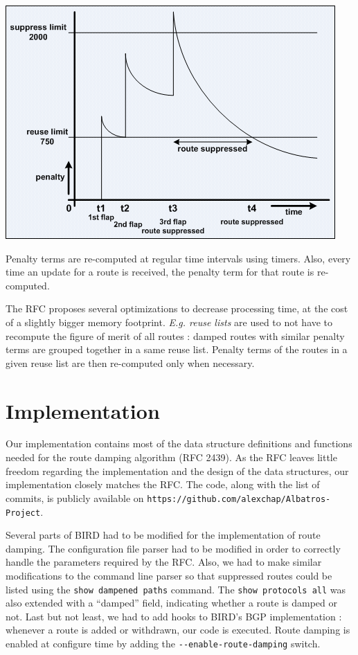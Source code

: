 \documentclass[a4paper,english]{IEEEtran}
\begin{document}
\begin{center}
\includegraphics[scale=0.5]{route_damping} 
\par\end{center}

Penalty terms are re-computed at regular time intervals using timers.
Also, every time an update for a route is received, the penalty term
for that route is re-computed.

The RFC proposes several optimizations to decrease processing time,
at the cost of a slightly bigger memory footprint. \textit{E.g. reuse
lists} are used to not have to recompute the figure of merit of all
routes : damped routes with similar penalty terms are grouped together
in a same reuse list. Penalty terms of the routes in a given reuse
list are then re-computed only when necessary.


\section{Implementation}

Our implementation contains most of the data structure definitions
and functions needed for the route damping algorithm (RFC 2439).
As the RFC leaves little freedom regarding the implementation and the 
design of the data structures, our implementation closely matches the RFC.
The code, along with the list of commits, is publicly available on
{\tt\small https://github.com/alexchap/Albatros-Project}.

Several parts of BIRD had to be modified for the implementation of route damping.
The configuration file parser had to be modified in order to correctly handle the parameters
required by the RFC.
Also, we had to make similar modifications to the command line parser so that suppressed routes
could be listed using the \texttt{\small show dampened paths} command.
The \texttt{\small show protocols all} was also extended with a ``damped'' field, indicating whether a route is damped or not.
Last but not least, we had to add hooks to BIRD's BGP implementation : whenever a route is added or withdrawn, our code is executed.
Route damping is enabled at configure time by adding the {\tt\small -{}-enable-route-damping}
switch.
\end{document}
